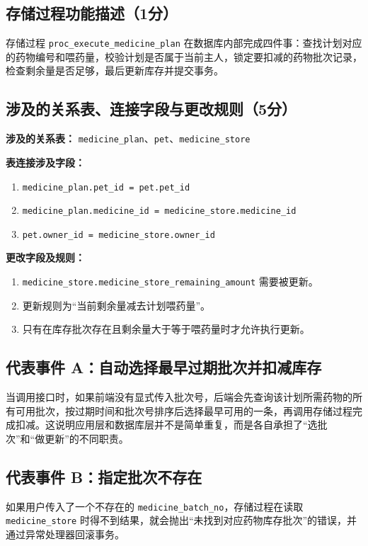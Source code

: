 \documentclass[12pt,a4paper,fontset=none]{ctexart}
\begin{document}
\subsection{存储过程功能描述（1分）}
存储过程 \texttt{proc\_execute\_medicine\_plan} 在数据库内部完成四件事：查找计划对应的药物编号和喂药量，校验计划是否属于当前主人，锁定要扣减的药物批次记录，检查剩余量是否足够，最后更新库存并提交事务。

\subsection{涉及的关系表、连接字段与更改规则（5分）}
\textbf{涉及的关系表：} \texttt{medicine\_plan}、\texttt{pet}、\texttt{medicine\_store}

\textbf{表连接涉及字段：}
\begin{enumerate}
    \item \texttt{medicine\_plan.pet\_id = pet.pet\_id}
    \item \texttt{medicine\_plan.medicine\_id = medicine\_store.medicine\_id}
    \item \texttt{pet.owner\_id = medicine\_store.owner\_id}
\end{enumerate}

\textbf{更改字段及规则：}
\begin{enumerate}
    \item \texttt{medicine\_store.medicine\_store\_remaining\_amount} 需要被更新。
    \item 更新规则为“当前剩余量减去计划喂药量”。
    \item 只有在库存批次存在且剩余量大于等于喂药量时才允许执行更新。
\end{enumerate}

\subsection{代表事件 A：自动选择最早过期批次并扣减库存}
当调用接口时，如果前端没有显式传入批次号，后端会先查询该计划所需药物的所有可用批次，按过期时间和批次号排序后选择最早可用的一条，再调用存储过程完成扣减。这说明应用层和数据库层并不是简单重复，而是各自承担了“选批次”和“做更新”的不同职责。

\subsection{代表事件 B：指定批次不存在}
如果用户传入了一个不存在的 \texttt{medicine\_batch\_no}，存储过程在读取 \texttt{medicine\_store} 时得不到结果，就会抛出“未找到对应药物库存批次”的错误，并通过异常处理器回滚事务。
\end{document}
